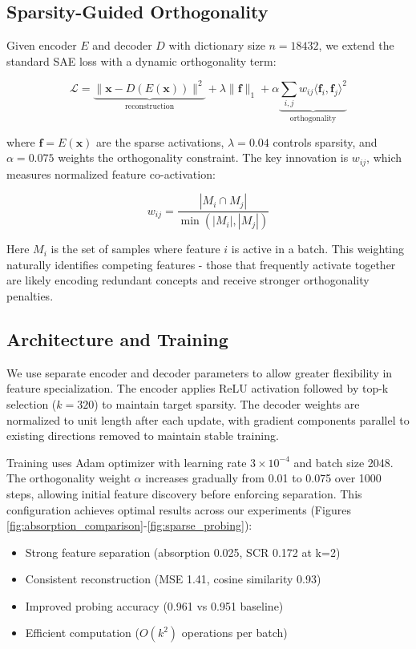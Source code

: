 \documentclass{article} %
\begin{document}
\subsection{Sparsity-Guided Orthogonality}
Given encoder $E$ and decoder $D$ with dictionary size $n=18432$, we extend the standard SAE loss with a dynamic orthogonality term:

\begin{equation}
    \mathcal{L} = \underbrace{\|\mathbf{x} - D(E(\mathbf{x}))\|^2}_\text{reconstruction} + \lambda\|\mathbf{f}\|_1 + \alpha \underbrace{\sum_{i,j} w_{ij}\langle \mathbf{f}_i, \mathbf{f}_j \rangle^2}_\text{orthogonality}
\end{equation}

where $\mathbf{f} = E(\mathbf{x})$ are the sparse activations, $\lambda=0.04$ controls sparsity, and $\alpha=0.075$ weights the orthogonality constraint. The key innovation is $w_{ij}$, which measures normalized feature co-activation:

\begin{equation}
    w_{ij} = \frac{|M_i \cap M_j|}{\min(|M_i|, |M_j|)}
\end{equation}

Here $M_i$ is the set of samples where feature $i$ is active in a batch. This weighting naturally identifies competing features - those that frequently activate together are likely encoding redundant concepts and receive stronger orthogonality penalties.

\subsection{Architecture and Training}
We use separate encoder and decoder parameters to allow greater flexibility in feature specialization. The encoder applies ReLU activation followed by top-k selection ($k=320$) to maintain target sparsity. The decoder weights are normalized to unit length after each update, with gradient components parallel to existing directions removed to maintain stable training.

Training uses Adam optimizer with learning rate $3\times10^{-4}$ and batch size 2048. The orthogonality weight $\alpha$ increases gradually from 0.01 to 0.075 over 1000 steps, allowing initial feature discovery before enforcing separation. This configuration achieves optimal results across our experiments (Figures \ref{fig:absorption_comparison}-\ref{fig:sparse_probing}):

\begin{itemize}
\item Strong feature separation (absorption 0.025, SCR 0.172 at k=2)
\item Consistent reconstruction (MSE 1.41, cosine similarity 0.93)
\item Improved probing accuracy (0.961 vs 0.951 baseline)
\item Efficient computation ($O(k^2)$ operations per batch)
\end{itemize}
\end{document}
